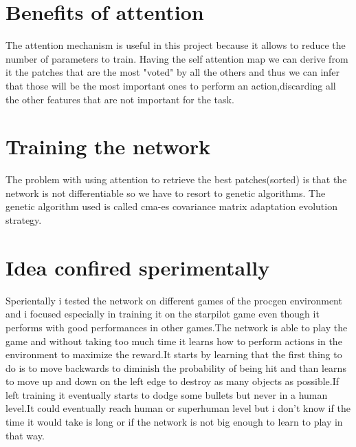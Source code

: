\documentclass{article}
\begin{document}
\section{Benefits of attention}
The attention mechanism\cite{attention} is useful in this project because it allows to reduce the number of parameters to train. Having the self attention map we can derive from it the patches that are the most "voted" by all the others and thus we can infer that those will be the most important ones to perform an action,discarding all the other features that are not important for the task.

\section{Training the network}
The problem with using attention to retrieve the best patches(sorted) is that the network is not differentiable so we have to resort to genetic algorithms.
The genetic algorithm used is called cma-es covariance matrix adaptation evolution strategy\cite{cmaes}.

\section{Idea confired sperimentally}
Sperientally i tested the network on different games of the procgen environment and i focused especially in training it on the starpilot game even though it performs with good performances in other games.The network is able to play the game and without taking too much time it learns how to perform actions in the environment to maximize the reward.It starts by learning that the first thing to do is to move backwards to diminish the probability of being hit and than learns to move up and down on the left edge to destroy as many  objects as possible.If left training it eventually starts to dodge some bullets but never in a human level.It could eventually reach human or superhuman level but i don't know if the time it would take is long or if the network is not big enough to learn to play in that way. 
\end{document}
